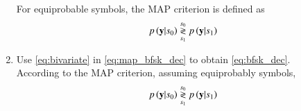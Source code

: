 \documentclass[journal,12pt,twocolumn]{IEEEtran}
\renewcommand\thesection{\arabic{section}}
\begin{document}
\begin{enumerate}[label=\thesection.\arabic*.,ref=\thesection.\theenumi]
%
%

For equiprobable symbols, the MAP criterion is defined as
%
\begin{equation}
\label{eq:map_bfsk_dec}
p\left(\mathbf{y}|s_0\right) \overset{s_0}{\underset{s_1}{\gtrless}} p\left(\mathbf{y}|s_1\right)
\end{equation}
\item
Use \eqref{eq:bivariate} in \eqref{eq:map_bfsk_dec}  to obtain \eqref{eq:bfsk_dec}.
\\
\solution According to the MAP criterion, assuming equiprobably symbols,
\begin{align}
p\left(\mathbf{y}|s_0\right) \overset{s_0}{\underset{s_1}{\gtrless}} p\left(\mathbf{y}|s_1\right)
\end{align}


\end{enumerate}
\end{document}

